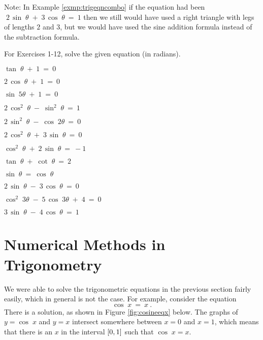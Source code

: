\divider
\vspace{1mm}

Note: In Example \ref{exmp:trigeqncombo} if the equation had been
$\;2\,\sin\;\theta \;+\; 3\,\cos\;\theta ~=~ 1$ then we still would have used a right triangle with
legs of lengths $2$ and $3$, but we would have used the sine addition formula
instead of the subtraction formula.

\divider
\vspace{2mm}

\startexercises\label{sec6dot1}
\vspace{2mm}
{\small
\par\noindent For Exercises 1-12, solve the given equation (in radians).
\begin{enumerate}[\bfseries 1.]
\begin{multicols}{3}
 \item $\tan\;\theta \;+\; 1 ~=~ 0$
 \item $2\,\cos\;\theta \;+\; 1 ~=~ 0$
 \item $\sin\;5\theta \;+\; 1 ~=~ 0$
\end{multicols}
\begin{multicols}{3}
 \item $2\,\cos^2 \;\theta \;-\; \sin^2 \;\theta ~=~ 1$
 \item $2\,\sin^2 \;\theta \;-\; \cos\;2\theta ~=~ 0$
 \item $2\,\cos^2 \;\theta \;+\; 3\,\sin\;\theta ~=~ 0$
\end{multicols}
\begin{multicols}{3}
 \item $\cos^2 \;\theta \;+\; 2\,\sin\;\theta ~=~ -1$
 \item $\tan\;\theta \;+\; \cot\;\theta ~=~ 2$
 \item $\sin\;\theta ~=~ \cos\;\theta$
\end{multicols}
\begin{multicols}{3}
 \item $2\,\sin\;\theta \;-\; 3\,\cos\;\theta ~=~ 0$
 \item $\cos^2 \;3\theta \;-\; 5\,\cos\;3\theta \;+\; 4 ~=~ 0$
 \item $3\,\sin\;\theta \;-\; 4\,\cos\;\theta ~=~ 1$
\end{multicols}
\end{enumerate}}
\newpage
\section{Numerical Methods in Trigonometry}
We were able to solve the trigonometric equations in the previous section fairly easily, which in
general is not the case. For example, consider the equation
\begin{equation}\label{eqn:cosinefixed}
 \cos\;x ~=~ x ~.
\end{equation}
There is a solution, as shown in Figure \ref{fig:cosineeqx} below. The graphs of $y=\cos\;x$
and $y=x$ intersect somewhere between $x=0$ and $x=1$, which means that there is an $x$ in the
interval $\lbrack 0,1 \rbrack$ such that $\cos\;x = x$.

